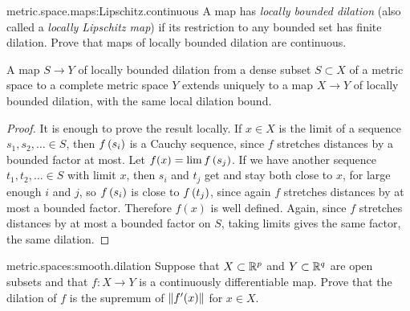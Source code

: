 \begin{problem}{metric.space.maps:Lipschitz.continuous}
A map has \emph{locally bounded dilation} (also called a \emph{locally Lipschitz map}) if its restriction to any bounded set has finite dilation.
Prove that maps of locally bounded dilation are continuous.
\end{problem}
\begin{proposition}\label{proposition:locally.bounded.dilation}
A map \(S \to Y\) of locally bounded dilation from a dense subset \(S \subset X\) of a metric space to a complete metric space \(Y\) extends uniquely to a map \(X \to Y\) of locally bounded dilation, with the same local dilation bound.
\end{proposition}
\begin{proof}
It is enough to prove the result locally.
If \(x \in X\) is the limit of a sequence \(s_1, s_2, \dots \in S\), then \(f\left(s_i\right)\) is a Cauchy sequence, since \(f\) stretches distances by a bounded factor at most.
Let \(f(x)=\lim f\left(s_j\right)\).
If we have another sequence \(t_1, t_2, \dots \in S\) with limit \(x\), then \(s_i\) and \(t_j\) get and stay both close to \(x\), for large enough \(i\) and \(j\), so \(f\left(s_i\right)\) is close to \(f\left(t_j\right)\), since again \(f\) stretches distances by at most a bounded factor.
Therefore \(f(x)\) is well defined.
Again, since \(f\) stretches distances by at most a bounded factor on \(S\), taking limits gives the same factor, the same dilation.
\end{proof}
\begin{problem}{metric.spaces:smooth.dilation}
Suppose that \(X \subset \mathbb{R}^{p}\) and \(Y \subset \mathbb{R}^{q}\) are open subsets and that \(f \colon X \to Y\) is a continuously differentiable map.
Prove that the dilation of \(f\) is the supremum of \(\left\|f'(x)\right\|\) for \(x \in X\).
\end{problem}

